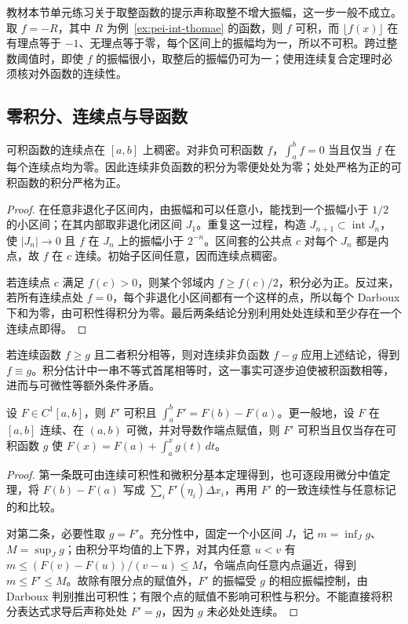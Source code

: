 \begin{notealert}[type=caution,title={不连续的外函数不能直接套用复合结论}]
教材本节单元练习关于取整函数的提示声称取整不增大振幅，这一步一般不成立。取 $f=-R$，其中 $R$ 为例~\ref{ex:pei-int-thomae} 的函数，则 $f$ 可积，而 $\lfloor f(x)\rfloor$ 在有理点等于 $-1$、无理点等于零，每个区间上的振幅均为一，所以不可积。跨过整数阈值时，即使 $f$ 的振幅很小，取整后的振幅仍可为一；使用连续复合定理时必须核对外函数的连续性。
\end{notealert}

\subsection{零积分、连续点与导函数}
\begin{theorem}
\label{thm:pei-int-zero-integral}
可积函数的连续点在 $[a,b]$ 上稠密。对非负可积函数 $f$，$\int_a^bf=0$ 当且仅当 $f$ 在每个连续点均为零。因此连续非负函数的积分为零便处处为零；处处严格为正的可积函数的积分严格为正。
\end{theorem}
\begin{proof}
在任意非退化子区间内，由振幅和可以任意小，能找到一个振幅小于 $1/2$ 的小区间；在其内部取非退化闭区间 $J_1$。重复这一过程，构造 $J_{n+1}\subset\operatorname{int}J_n$，使 $|J_n|\to0$ 且 $f$ 在 $J_n$ 上的振幅小于 $2^{-n}$。区间套的公共点 $c$ 对每个 $J_n$ 都是内点，故 $f$ 在 $c$ 连续。初始子区间任意，因而连续点稠密。

若连续点 $c$ 满足 $f(c)>0$，则某个邻域内 $f\ge f(c)/2$，积分必为正。反过来，若所有连续点处 $f=0$，每个非退化小区间都有一个这样的点，所以每个 Darboux 下和为零，由可积性得积分为零。最后两条结论分别利用处处连续和至少存在一个连续点即得。
\end{proof}
若连续函数 $f\ge g$ 且二者积分相等，则对连续非负函数 $f-g$ 应用上述结论，得到 $f\equiv g$。积分估计中一串不等式首尾相等时，这一事实可逐步迫使被积函数相等，进而与可微性等额外条件矛盾。

\begin{proposition}
设 $F\in C^1[a,b]$，则 $F'$ 可积且 $\int_a^bF'=F(b)-F(a)$。更一般地，设 $F$ 在 $[a,b]$ 连续、在 $(a,b)$ 可微，并对导数作端点赋值，则 $F'$ 可积当且仅当存在可积函数 $g$ 使 $F(x)=F(a)+\int_a^xg(t)\,dt$。
\end{proposition}
\begin{proof}
第一条既可由连续可积性和微积分基本定理得到，也可逐段用微分中值定理，将 $F(b)-F(a)$ 写成 $\sum_i F'(\eta_i)\Delta x_i$，再用 $F'$ 的一致连续性与任意标记的和比较。

对第二条，必要性取 $g=F'$。充分性中，固定一个小区间 $J$，记 $m=\inf_Jg$、$M=\sup_Jg$；由积分平均值的上下界，对其内任意 $u<v$ 有 $m\le(F(v)-F(u))/(v-u)\le M$，令端点向任意内点逼近，得到 $m\le F'\le M$。故除有限分点的赋值外，$F'$ 的振幅受 $g$ 的相应振幅控制，由 Darboux 判别推出可积性；有限个点的赋值不影响可积性与积分。不能直接将积分表达式求导后声称处处 $F'=g$，因为 $g$ 未必处处连续。
\end{proof}

